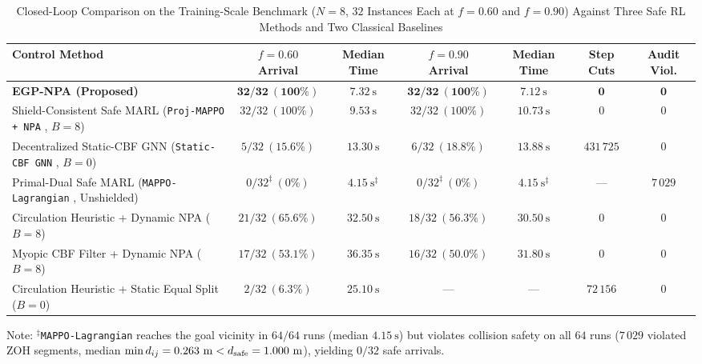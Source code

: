 \begin{table}[t]
 \centering\footnotesize
 \caption{Closed-Loop Comparison on the Training-Scale Benchmark ($N=8$, $32$ Instances Each at $f=0.60$ and $f=0.90$) Against Three Safe RL Methods and Two Classical Baselines}\label{tab:e1}
 \begin{tabularx}{\textwidth}{@{}Xcccccc@{}}
 \toprule
 Control Method & $f=0.60$ Arrival & Median Time & $f=0.90$ Arrival & Median Time & Step Cuts & Audit Viol.\\
 \midrule
 \textbf{EGP-NPA (Proposed)} & $\mathbf{32/32\ (100\%)}$ & $\mathbf{7.32\ \mathrm s}$ & $\mathbf{32/32\ (100\%)}$ & $\mathbf{7.12\ \mathrm s}$ & $\mathbf{0}$ & $\mathbf{0}$\\
 Shield-Consistent Safe MARL (\texttt{Proj-MAPPO + NPA} \cite{wabersich2021,liu2026saferl}, $B=8$) & $32/32\ (100\%)$ & $9.53\ \mathrm s$ & $32/32\ (100\%)$ & $10.73\ \mathrm s$ & $0$ & $0$\\
 Decentralized Static-CBF GNN (\texttt{Static-CBF GNN} \cite{zhang2025gcbf,zhang2025dgppo}, $B=0$) & $5/32\ (15.6\%)$ & $13.30\ \mathrm s$ & $6/32\ (18.8\%)$ & $13.88\ \mathrm s$ & $431\,725$ & $0$\\
 Primal-Dual Safe MARL (\texttt{MAPPO-Lagrangian} \cite{gu2023safe}, Unshielded) & $0/32^\ddagger\ (0\%)$ & $4.15\ \mathrm s^\ddagger$ & $0/32^\ddagger\ (0\%)$ & $4.15\ \mathrm s^\ddagger$ & --- & $7\,029$\\
 Circulation Heuristic \cite{goncalves2023circulation} + Dynamic NPA ($B=8$) & $21/32\ (65.6\%)$ & $32.50\ \mathrm s$ & $18/32\ (56.3\%)$ & $30.50\ \mathrm s$ & $0$ & $0$\\
 Myopic CBF Filter \cite{ames2017cbf,reis2021} + Dynamic NPA ($B=8$) & $17/32\ (53.1\%)$ & $36.35\ \mathrm s$ & $16/32\ (50.0\%)$ & $31.80\ \mathrm s$ & $0$ & $0$\\
 Circulation Heuristic + Static Equal Split \cite{ames2017cbf,zhang2025gcbf} ($B=0$) & $2/32\ (6.3\%)$ & $25.10\ \mathrm s$ & --- & --- & $72\,156$ & $0$\\
 \bottomrule
 \end{tabularx}
 \vspace{1.5pt}
 \par\raggedright\scriptsize Note: $^\ddagger$\texttt{MAPPO-Lagrangian} reaches the goal vicinity in $64/64$ runs (median $4.15\ \mathrm s$) but violates collision safety on all $64$ runs ($7\,029$ violated ZOH segments, median $\min d_{ij}=0.263\ \mathrm m<d_{\mathrm{safe}}=1.000\ \mathrm m$), yielding $0/32$ safe arrivals.
\end{table}

